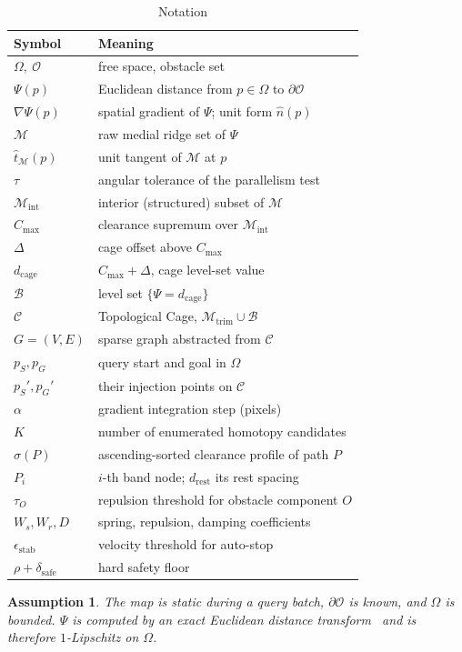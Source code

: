 \documentclass[conference]{IEEEtran}
\newtheorem{assumption}{Assumption}
\begin{document}
\begin{table}[htbp]
\caption{Notation}
\label{tab:notation}
\begin{center}
\renewcommand{\arraystretch}{1.12}
\begin{tabular}{@{}ll@{}}
\toprule
\textbf{Symbol} & \textbf{Meaning} \\ \midrule
$\Omega,\ \mathcal{O}$ & free space, obstacle set \\
$\Psi(p)$ & Euclidean distance from $p\in\Omega$ to $\partial\mathcal{O}$ \\
$\nabla\Psi(p)$ & spatial gradient of $\Psi$; unit form $\hat{n}(p)$ \\
$\mathcal{M}$ & raw medial ridge set of $\Psi$ \\
$\hat{t}_{\mathcal{M}}(p)$ & unit tangent of $\mathcal{M}$ at $p$ \\
$\tau$ & angular tolerance of the parallelism test \\
$\mathcal{M}_{\mathrm{int}}$ & interior (structured) subset of $\mathcal{M}$ \\
$C_{\max}$ & clearance supremum over $\mathcal{M}_{\mathrm{int}}$ \\
$\Delta$ & cage offset above $C_{\max}$ \\
$d_{\mathrm{cage}}$ & $C_{\max}+\Delta$, cage level-set value \\
$\mathcal{B}$ & level set $\{\Psi = d_{\mathrm{cage}}\}$ \\
$\mathcal{C}$ & Topological Cage, $\mathcal{M}_{\mathrm{trim}}\cup\mathcal{B}$ \\
$G=(V,E)$ & sparse graph abstracted from $\mathcal{C}$ \\
$p_S,p_G$ & query start and goal in $\Omega$ \\
$p_S',p_G'$ & their injection points on $\mathcal{C}$ \\
$\alpha$ & gradient integration step (pixels) \\
$K$ & number of enumerated homotopy candidates \\
$\sigma(P)$ & ascending-sorted clearance profile of path $P$ \\
$P_i$ & $i$-th band node; $d_{\mathrm{rest}}$ its rest spacing \\
$\tau_O$ & repulsion threshold for obstacle component $O$ \\
$W_s,W_r,D$ & spring, repulsion, damping coefficients \\
$\epsilon_{\mathrm{stab}}$ & velocity threshold for auto-stop \\
$\rho+\delta_{\mathrm{safe}}$ & hard safety floor \\ \bottomrule
\end{tabular}
\end{center}
\end{table}
\begin{assumption}
The map is static during a query batch, $\partial\mathcal{O}$ is known, and $\Omega$ is bounded. $\Psi$ is computed by an exact Euclidean distance transform~\cite{felzenszwalb2012} and is therefore $1$-Lipschitz on $\Omega$.
\end{assumption}
\end{document}
